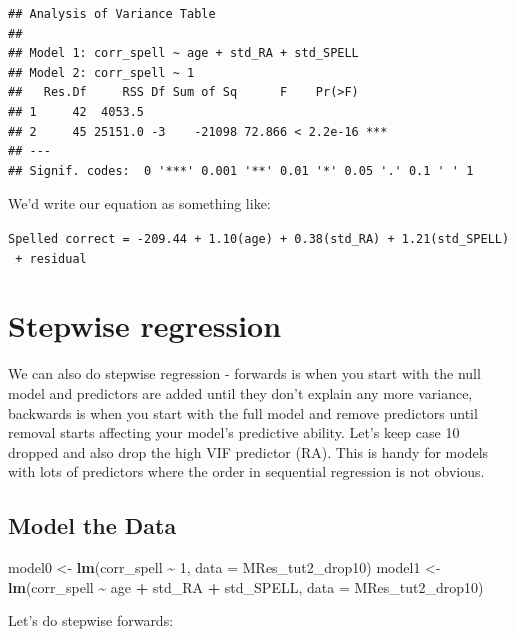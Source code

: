 \documentclass[
]{book}
\newenvironment{Shaded}{\begin{snugshade}}{\end{snugshade}}
\newcommand{\AttributeTok}[1]{\textcolor[rgb]{0.13,0.29,0.53}{#1}}
\newcommand{\DecValTok}[1]{\textcolor[rgb]{0.00,0.00,0.81}{#1}}
\newcommand{\FunctionTok}[1]{\textcolor[rgb]{0.13,0.29,0.53}{\textbf{#1}}}
\newcommand{\NormalTok}[1]{#1}
\newcommand{\OtherTok}[1]{\textcolor[rgb]{0.56,0.35,0.01}{#1}}
\newcommand{\SpecialCharTok}[1]{\textcolor[rgb]{0.81,0.36,0.00}{\textbf{#1}}}
\begin{document}
\begin{verbatim}
## Analysis of Variance Table
## 
## Model 1: corr_spell ~ age + std_RA + std_SPELL
## Model 2: corr_spell ~ 1
##   Res.Df     RSS Df Sum of Sq      F    Pr(>F)    
## 1     42  4053.5                                  
## 2     45 25151.0 -3    -21098 72.866 < 2.2e-16 ***
## ---
## Signif. codes:  0 '***' 0.001 '**' 0.01 '*' 0.05 '.' 0.1 ' ' 1
\end{verbatim}

We'd write our equation as something like:

\texttt{Spelled\ correct\ =\ -209.44\ +\ 1.10(age)\ +\ 0.38(std\_RA)\ +\ 1.21(std\_SPELL)\ +\ residual}

\hypertarget{stepwise-regression}{%
\section{Stepwise regression}\label{stepwise-regression}}

We can also do stepwise regression - forwards is when you start with the null model and predictors are added until they don't explain any more variance, backwards is when you start with the full model and remove predictors until removal starts affecting your model's predictive ability. Let's keep case 10 dropped and also drop the high VIF predictor (RA). This is handy for models with lots of predictors where the order in sequential regression is not obvious.

\hypertarget{model-the-data-2}{%
\subsection{Model the Data}\label{model-the-data-2}}

\begin{Shaded}
\begin{Highlighting}[]
\NormalTok{model0 }\OtherTok{\textless{}{-}} \FunctionTok{lm}\NormalTok{(corr\_spell }\SpecialCharTok{\textasciitilde{}} \DecValTok{1}\NormalTok{, }\AttributeTok{data =}\NormalTok{ MRes\_tut2\_drop10)}
\NormalTok{model1 }\OtherTok{\textless{}{-}} \FunctionTok{lm}\NormalTok{(corr\_spell }\SpecialCharTok{\textasciitilde{}}\NormalTok{ age }\SpecialCharTok{+}\NormalTok{ std\_RA }\SpecialCharTok{+}\NormalTok{ std\_SPELL, }\AttributeTok{data =}\NormalTok{ MRes\_tut2\_drop10)}
\end{Highlighting}
\end{Shaded}

Let's do stepwise forwards:
\end{document}
